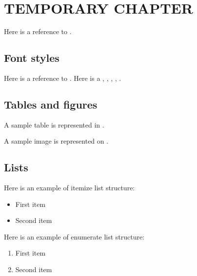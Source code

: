 \section{TEMPORARY CHAPTER}

Here is a reference to .

\subsection{Font styles}

Here is a reference to .
Here is a , , , , .

\subsection{Tables and figures}

A sample table is represented in .


A sample image is represented on .


\subsection{Lists}

Here is an example of itemize list structure:
\begin{itemize}
	\item First item
	\item Second item
\end{itemize}

Here is an example of enumerate list structure:
\begin{enumerate}
	\item First item
	\item Second item
\end{enumerate}

